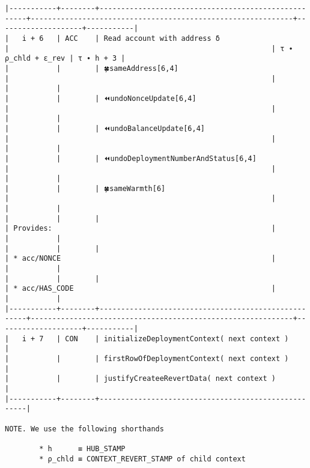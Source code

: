\documentclass[varwidth=\maxdimen,margin=0.5cm,multi={verbatim}]{standalone}
\begin{document}
\begin{verbatim}
|-----------+--------+-----------------------------------------------------+-------------------------------------------------------------+--------------------+-----------|
|   i + 6   | ACC    | Read account with address δ                         |                                                             | τ ∙ ρ_chld + ε_rev | τ ∙ h + 3 |
|           |        | 🍀sameAddress[6,4]                                  |                                                             |                    |           |
|           |        | ⏪undoNonceUpdate[6,4]                              |                                                             |                    |           |
|           |        | ⏪undoBalanceUpdate[6,4]                            |                                                             |                    |           |
|           |        | ⏪undoDeploymentNumberAndStatus[6,4]                |                                                             |                    |           |
|           |        | 🍀sameWarmth[6]                                     |                                                             |                    |           |
|           |        |                                                     | Provides:                                                   |                    |           |
|           |        |                                                     | * acc/NONCE                                                 |                    |           |
|           |        |                                                     | * acc/HAS_CODE                                              |                    |           |
|-----------+--------+-----------------------------------------------------+-------------------------------------------------------------+--------------------+-----------|
|   i + 7   | CON    | initializeDeploymentContext( next context )         |
|           |        | firstRowOfDeploymentContext( next context )         |
|           |        | justifyCreateeRevertData( next context )            |
|-----------+--------+-----------------------------------------------------|

NOTE. We use the following shorthands

        * h      ≡ HUB_STAMP
        * ρ_chld ≡ CONTEXT_REVERT_STAMP of child context

\end{verbatim}
\end{document}
